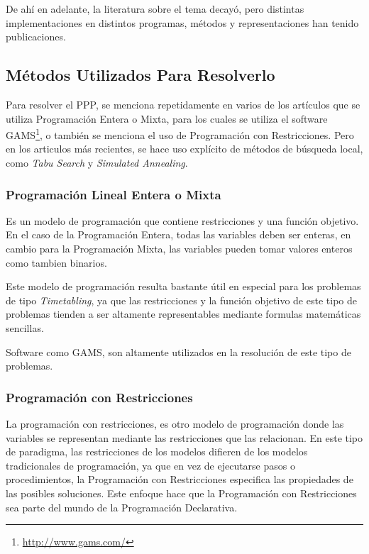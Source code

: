 \documentclass[letter, 10pt]{article}
\begin{document}
De ahí en adelante, la literatura sobre el tema decayó, pero distintas implementaciones en distintos programas, métodos y representaciones han tenido publicaciones. \cite{CustomizingSearch,ProgressOnThePartyProblem}

\subsection{Métodos Utilizados Para Resolverlo}
Para resolver el PPP, se menciona repetidamente en varios de los artículos que se utiliza Programación Entera o Mixta, para los cuales se utiliza el software GAMS\footnote{\url{http://www.gams.com/}}, o también se menciona el uso de Programación con Restricciones\cite{FirstPublication}. Pero en los articulos más recientes, se hace uso explícito de métodos de búsqueda local, como \textit{Tabu Search} y \textit{Simulated Annealing}.

\subsubsection{Programación Lineal Entera o Mixta}
Es un modelo de programación que contiene restricciones y una función objetivo. En el caso de la Programación Entera, todas las variables deben ser enteras, en cambio para la Programación Mixta, las variables pueden tomar valores enteros como tambien binarios.

Este modelo de programación resulta bastante útil en especial para los problemas de tipo \textit{Timetabling}, ya que las restricciones y la función objetivo de este tipo de problemas tienden a ser altamente representables mediante formulas matemáticas sencillas.

Software como GAMS, son altamente utilizados en la resolución de este tipo de problemas.

\subsubsection{Programación con Restricciones}
La programación con restricciones, es otro modelo de programación donde las variables se representan mediante las restricciones que las relacionan. En este tipo de paradigma, las restricciones de los modelos difieren de los modelos tradicionales de programación, ya que en vez de ejecutarse pasos o procedimientos, la Programación con Restricciones especifica las propiedades de las posibles soluciones. Este enfoque hace que la Programación con Restricciones sea parte del mundo de la Programación Declarativa.
\end{document}
